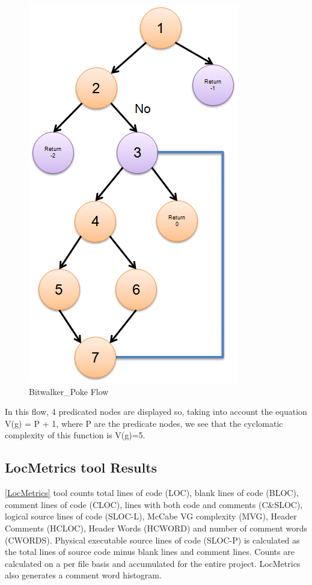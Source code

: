 \begin{figure}[H]
\centering
\includegraphics{./figures/flow.png}
\caption{Bitwalker\_Poke Flow}
\end{figure}

In this flow, 4 predicated nodes are displayed so, taking into account the equation V(g) = P + 1, where P are the predicate nodes, we see that the cyclomatic complexity of this function is V(g)=5.

\subsection{LocMetrics tool Results}

\href{http://www.locmetrics.com/}{[LocMetrics]} tool counts total lines of code (LOC), blank lines of code (BLOC), comment lines of code (CLOC), lines with both code and comments (C\&SLOC), logical source lines of code (SLOC-L), McCabe VG complexity (MVG), Header Comments (HCLOC), Header Words (HCWORD) and number of comment words (CWORDS). Physical executable source lines of code (SLOC-P) is calculated as the total lines of source code minus blank lines and comment lines. Counts are calculated on a per file basis and accumulated for the entire project. LocMetrics also generates a comment word histogram.

